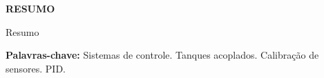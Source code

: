 \documentclass[a4paper,12pt]{article}
\begin{document}
\newpage


\thispagestyle{empty}

\begin{center}
{\large \textbf{RESUMO}}
\end{center}

\vspace{3cm}

\vspace{\baselineskip}

\begin{justify}
    Resumo
\end{justify}

\vspace{\baselineskip}

\noindent\textbf{Palavras-chave:} Sistemas de controle. Tanques acoplados. Calibração de sensores. PID.

\newpage


%
%
%
%
\end{document}
